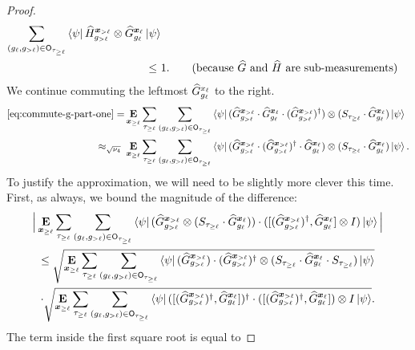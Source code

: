 \begin{proof}
\begin{align*}
   \sum_{(g_{\ell}, g_{>\ell}) \in \sfO_{\tau_{\geq \ell}}} \bra{\psi}
    \wH^{\bx_{>\ell}}_{g_{>\ell}} \ot
    \wG^{\bx_{\ell}}_{g_\ell} \ket{\psi} \\
\leq~&  1. \tag{because $\wG$ and $\wH$ are sub-measurements}
\end{align*}
We continue commuting the leftmost $\widehat{G}^{x_{\ell}}_{g_\ell}$ to the
right. 
\begin{align}
  \eqref{eq:commute-g-part-one} =&
  \mathop{\bf E\/}_{{\boldsymbol{x}}_{\geq \ell}} \sum_{\tau_{\geq \ell}}  \sum_{(g_{\ell}, g_{>\ell}) \in \mathsf{O}_{\tau_{\geq \ell}}}
	\bra{\psi} (\widehat{G}^{{\boldsymbol{x}}_{> \ell}}_{g_{> \ell}} \cdot \widehat{G}^{{\boldsymbol{x}}_{\ell}}_{g_{\ell}} \cdot (\widehat{G}^{{\boldsymbol{x}}_{> \ell}}_{g_{> \ell}})^\dagger) \otimes (S_{\tau_{\geq \ell}} \cdot \widehat{G}^{{\boldsymbol{x}}_{\ell}}_{g_{\ell}})\ket{\psi} \nonumber\\
  \approx_{\sqrt{\nu_4}}~& 
   \mathop{\bf E\/}_{{\boldsymbol{x}}_{\geq \ell}} \sum_{\tau_{\geq \ell}}  \sum_{(g_{\ell}, g_{>\ell}) \in \mathsf{O}_{\tau_{\geq \ell}}}
	\bra{\psi} (\widehat{G}^{{\boldsymbol{x}}_{> \ell}}_{g_{> \ell}} \cdot (\widehat{G}^{{\boldsymbol{x}}_{> \ell}}_{g_{> \ell}})^\dagger \cdot \widehat{G}^{{\boldsymbol{x}}_{\ell}}_{g_{\ell}}) \otimes (S_{\tau_{\geq \ell}} \cdot \widehat{G}^{{\boldsymbol{x}}_{\ell}}_{g_{\ell}})\ket{\psi}. \label{eq:commute-g-part-two}
\end{align}
To justify the approximation, we will need to be slightly more
clever this time. First, as always, we bound the magnitude of the
difference:
\begin{multline}\label{eq:call-again-later-part-dos}
  \Big|  \mathop{\bf E\/}_{{\boldsymbol{x}}_{\geq \ell}} \sum_{\tau_{\geq \ell}}  \sum_{(g_{\ell}, g_{>\ell}) \in \mathsf{O}_{\tau_{\geq \ell}}}
  \bra{\psi} (\widehat{G}^{{\boldsymbol{x}}_{>\ell}}_{g_{>\ell}}         \otimes
    (S_{\tau_{\geq \ell}} \cdot
  \widehat{G}^{{\boldsymbol{x}}_\ell}_{g_\ell})) \cdot ([ (\widehat{G}^{{\boldsymbol{x}}_{>\ell}}_{g_{>\ell}})^\dagger,
    \widehat{G}^{{\boldsymbol{x}}_\ell}_{g_\ell} ] \otimes I) \ket{\psi} \Big|\\
  \leq   \sqrt{\mathop{\bf E\/}_{{\boldsymbol{x}}_{\geq \ell}} \sum_{\tau_{\geq \ell}}  \sum_{(g_{\ell}, g_{>\ell}) \in \mathsf{O}_{\tau_{\geq \ell}}}
    \bra{\psi}
    (\widehat{G}^{{\boldsymbol{x}}_{>\ell}}_{g_{>\ell}})\cdot (
    \widehat{G}^{{\boldsymbol{x}}_{>\ell}}_{g_{>\ell}})^\dagger \otimes (S_{\tau_{\geq \ell}} \cdot
    \widehat{G}^{{\boldsymbol{x}}_{\ell}}_{g_\ell}  \cdot S_{\tau_{\geq \ell}})
    \ket{\psi}} \\
  \cdot \sqrt{ \mathop{\bf E\/}_{{\boldsymbol{x}}_{\geq \ell}}
  \sum_{\tau_{\geq \ell}}  \sum_{(g_{\ell}, g_{>\ell}) \in \mathsf{O}_{\tau_{\geq \ell}}}
   \bra{\psi} ([ (\widehat{G}^{{\boldsymbol{x}}_{>\ell}}_{g_{>\ell}})^\dagger,
    \widehat{G}^{{\boldsymbol{x}}_\ell}_{g_\ell} ])^\dagger \cdot ([ (\widehat{G}^{{\boldsymbol{x}}_{>\ell}}_{g_{>\ell}})^\dagger,
    \widehat{G}^{{\boldsymbol{x}}_\ell}_{g_\ell} ]) \otimes I \ket{\psi}}.
\end{multline}
The term inside the first square root is equal to

\end{proof}
